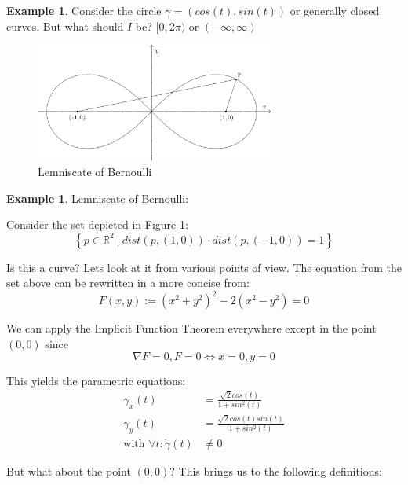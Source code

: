 \documentclass[a4paper,11pt,notitlepage,fullpage]{paper}
\theoremstyle{plain}
\theoremstyle{definition}
\newtheorem{exmp}[thm]{Example} %
\begin{document}
\begin{exmp}
Consider the circle $\gamma = (cos(t), sin(t))$ or generally closed curves. But what should $I$ be? $[0, 2\pi)$ or $(-\infty, \infty)$
\end{exmp}

\begin{figure}[H]
\centering
\includegraphics[width = 0.7\textwidth]{img/lemniscate}
\caption{Lemniscate of Bernoulli}
\label{fig:lemniscate}
\end{figure}


\begin{exmp}
Lemniscate of Bernoulli:

Consider the set depicted in Figure \ref{fig:lemniscate}:
\begin{equation*}
\left\{p \in \mathbb R^2 ~|~ dist\left(p, \left(1,0\right)\right) \cdot dist\left(p, \left(-1,0\right)\right) = 1\right\}
\end{equation*}

Is this a curve? Lets look at it from various points of view. The equation from the set above can be rewritten in a more concise from: 
\begin{equation*}
F(x,y) := (x^2+y^2)^2 - 2(x^2-y^2) = 0
\end{equation*}

We can apply the Implicit Function Theorem everywhere except in the point $(0,0)$ since
\begin{equation*}
\nabla F = 0, F = 0 \Leftrightarrow x = 0, y = 0
\end{equation*}

This yields the parametric equations:
\begin{align*}
\gamma_x(t) &= \frac{\sqrt 2 cos(t)}{1+sin^2(t)} \\
\gamma_y(t) &= \frac{\sqrt 2 cos(t) sin(t)}{1+sin^2(t)} \\
\text{with }\forall t:\dot\gamma(t) &\neq 0 
\end{align*}

But what about the point $(0,0)$? This brings us to the following definitions:
\end{exmp}
\end{document}
